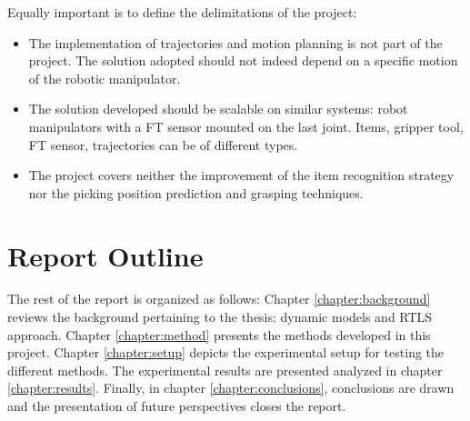 \documentclass[/home/francois/latex/report/main.tex]{subfiles}
\begin{document}
Equally important is to define the delimitations of the project:

\begin{itemize}
    \item The implementation of trajectories and motion planning is not part of the project. The solution adopted should not indeed depend on a specific motion of the robotic manipulator.
    \item The solution developed should be scalable on similar systems: robot manipulators with a \ac{FT} sensor mounted on the last joint. Items, gripper tool, \ac{FT} sensor, trajectories can be of different types.
    \item The project covers neither the improvement of the item recognition strategy nor the picking position prediction and grasping techniques.
\end{itemize}


\section{Report Outline}

The rest of the report is organized as follows: Chapter \ref{chapter:background} reviews the background pertaining to the thesis: dynamic models and \ac{RTLS} approach. Chapter \ref{chapter:method} presents the methods developed in this project. Chapter \ref{chapter:setup} depicts the experimental setup for testing the different methods. The experimental results are presented analyzed in chapter \ref{chapter:results}. Finally, in chapter \ref{chapter:conclusions}, conclusions are drawn and the presentation of future perspectives closes the report.
\end{document}
